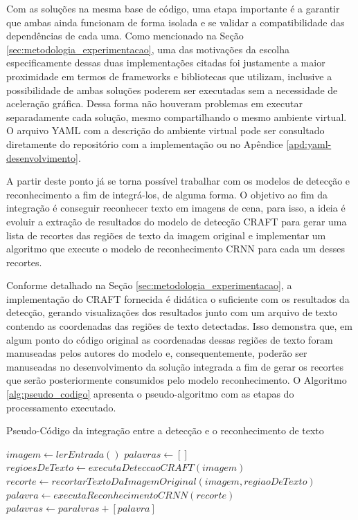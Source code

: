 Com as soluções na mesma base de código, uma etapa importante é a garantir que ambas ainda funcionam de forma isolada e se validar a compatibilidade das dependências de cada uma. Como mencionado na Seção \ref{sec:metodologia_experimentacao}, uma das motivações da escolha especificamente dessas duas implementações citadas foi justamente a maior proximidade em termos de frameworks e bibliotecas que utilizam, inclusive a possibilidade de ambas soluções poderem ser executadas sem a necessidade de aceleração gráfica. Dessa forma não houveram problemas em executar separadamente cada solução, mesmo compartilhando o mesmo ambiente virtual. O arquivo YAML com a descrição do ambiente virtual pode ser consultado diretamente do repositório com a implementação ou no Apêndice \ref{apd:yaml-desenvolvimento}.

A partir deste ponto já se torna possível trabalhar com os modelos de detecção e reconhecimento a fim de integrá-los, de alguma forma. O objetivo ao fim da integração é conseguir reconhecer texto em imagens de cena, para isso, a ideia é evoluir a extração de resultados do modelo de detecção CRAFT para gerar uma lista de recortes das regiões de texto da imagem original e implementar um algoritmo que execute o modelo de reconhecimento CRNN para cada um desses recortes.

Conforme detalhado na Seção \ref{sec:metodologia_experimentacao}, a implementação do CRAFT fornecida é didática o suficiente com os resultados da detecção, gerando visualizações dos resultados junto com um arquivo de texto contendo as coordenadas das regiões de texto detectadas. Isso demonstra que, em algum ponto do código original as coordenadas dessas regiões de texto foram manuseadas pelos autores do modelo e, consequentemente, poderão ser manuseadas no desenvolvimento da solução integrada a fim de gerar os recortes que serão posteriormente consumidos pelo modelo reconhecimento. O Algoritmo \ref{alg:pseudo_codigo} apresenta o pseudo-algoritmo com as etapas do processamento executado.


\begin{algorithm}
\caption{Pseudo-Código da integração entre a detecção e o reconhecimento de texto}\label{alg:pseudo_codigo}
\begin{algorithmic}
\State $imagem \gets{lerEntrada()}$
\State $palavras \gets{[ ]}$
\State $regioesDeTexto \gets{executaDeteccaoCRAFT(imagem)}$
    \State $recorte \gets{recortarTextoDaImagemOriginal(imagem,regiaoDeTexto)}$
    \State $palavra \gets{executaReconhecimentoCRNN(recorte)}$
    \State $palavras \gets{paralvras + [palavra]}$
\EndFor
\State{}
\end{algorithmic}
\end{algorithm}

